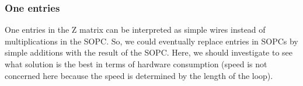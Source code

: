 	\subsubsection{One entries}
		One entries in the Z matrix can be interpreted as simple wires instead of multiplications in the SOPC.
		So, we could eventually replace entries in SOPCs by simple additions with the result of the SOPC.
		Here, we should investigate to see what solution is the best in terms of hardware consumption
		(speed is not concerned here because the speed is determined by the length of the loop).


